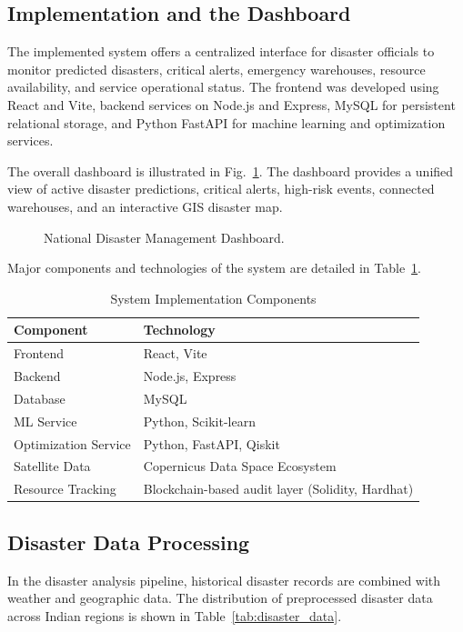 \documentclass[conference]{IEEEtran}
\begin{document}
\subsection{Implementation and the Dashboard}
The implemented system offers a centralized interface for disaster officials to monitor predicted disasters, critical alerts, emergency warehouses, resource availability, and service operational status. The frontend was developed using React and Vite, backend services on Node.js and Express, MySQL for persistent relational storage, and Python FastAPI for machine learning and optimization services.

The overall dashboard is illustrated in Fig.~\ref{fig:dashboard}. The dashboard provides a unified view of active disaster predictions, critical alerts, high-risk events, connected warehouses, and an interactive GIS disaster map.

\begin{figure}[htbp]
\centering
\fbox{\rule{0pt}{1.8in} \rule{0.9\linewidth}{0pt}}
\caption{National Disaster Management Dashboard.}
\label{fig:dashboard}
\end{figure}

Major components and technologies of the system are detailed in Table~\ref{tab:components}.

\begin{table}[htbp]
\centering
\caption{System Implementation Components}
\label{tab:components}
\begin{tabular}{ll}
\toprule
\textbf{Component} & \textbf{Technology} \\
\midrule
Frontend & React, Vite \\
Backend & Node.js, Express \\
Database & MySQL \\
ML Service & Python, Scikit-learn \\
Optimization Service & Python, FastAPI, Qiskit \\
Satellite Data & Copernicus Data Space Ecosystem \\
Resource Tracking & Blockchain-based audit layer (Solidity, Hardhat) \\
\bottomrule
\end{tabular}
\end{table}

\subsection{Disaster Data Processing}
In the disaster analysis pipeline, historical disaster records are combined with weather and geographic data. The distribution of preprocessed disaster data across Indian regions is shown in Table~\ref{tab:disaster_data}.
\end{document}
